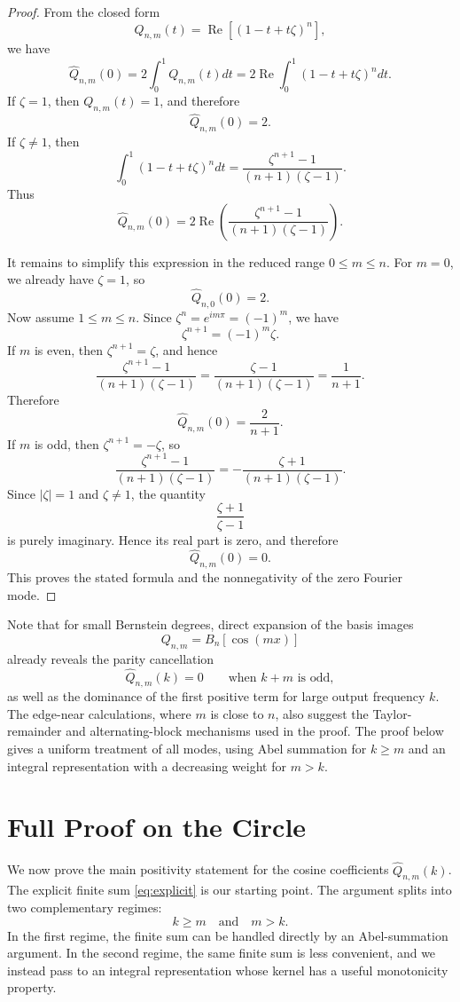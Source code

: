 \documentclass[10pt,a4paper]{amsart}
\DeclareMathOperator{\RealPart}{Re}
\renewcommand{\Re}{\RealPart}
\begin{document}
\begin{proof}
From the closed form
\[
Q_{n,m}(t)= \Re[( 1-t+t\zeta )^n],
\]
we have
\[
\widehat Q_{n,m}(0)
=
2\int_0^1 Q_{n,m}(t) dt
=
2\Re\int_0^1 (1-t+t\zeta)^n dt.
\]
If $\zeta = 1$, then $Q_{n,m}(t) = 1$, and therefore
\[
\widehat Q_{n,m}(0)=2.
\]
If $\zeta \ne 1$, then
\[
\int_0^1 (1-t+t\zeta)^n dt
=
\frac{\zeta^{n+1}-1}{(n+1)(\zeta - 1)}.
\]
Thus
\[
\widehat Q_{n,m}(0)
=
2\Re\!\left(
\frac{\zeta^{n+1}-1}{(n+1)(\zeta -1)}
\right).
\]

It remains to simplify this expression in the reduced range $0\le m\le n$.
For $m=0$, we already have $\zeta=  1$, so
\[
\widehat Q_{n,0}(0) = 2.
\]
Now assume $1\le m\le n$. Since $\zeta^n = e^{ im\pi } = (-1)^m$, we have
\[
\zeta^{n+1} = (-1)^m\zeta.
\]
If $m$ is even, then $\zeta^{n+1} = \zeta$, and hence
\[
\frac{\zeta^{n+1}-1}{(n+1)(\zeta-1)}
=
\frac{\zeta-1}{(n+1)(\zeta-1)}
=
\frac{1}{n+1}.
\]
Therefore
\[
\widehat Q_{n,m}(0) = \frac{2}{n+1}.
\]
If $m$ is odd, then $\zeta^{n+1} = -\zeta$, so
\[
\frac{\zeta^{n+1}-1}{(n+1)(\zeta-1)}
=
-\frac{\zeta+1}{(n+1)(\zeta-1)}.
\]
Since $|\zeta|=1$ and $\zeta\ne1$, the quantity
\[
\frac{\zeta+1}{\zeta-1}
\]
is purely imaginary. Hence its real part is zero, and therefore
\[
\widehat Q_{n,m}(0) =0.
\]
This proves the stated formula and the nonnegativity of the zero Fourier mode.
\end{proof}

Note that for small Bernstein degrees, direct expansion of the basis images 
\[
Q_{n,m}=B_n[\cos(mx)] 
\] 
already reveals the parity cancellation 
\[ 
\widehat Q_{n,m}(k)=0 \qquad\text{when }k+m\text{ is odd}, 
\] 
as well as the dominance of the first positive term for large output frequency $k$. The edge-near calculations, where $m$ is close to $n$, also suggest the Taylor-remainder and alternating-block mechanisms used in the proof. The proof below gives a uniform treatment of all modes, using Abel summation for $k\ge m$ and an integral representation with a decreasing weight for $m>k$.


\section{Full Proof on the Circle}
\label{sec:full-proof-circle}

We now prove the main positivity statement for the cosine coefficients $\widehat Q_{n,m}(k)$. The explicit finite sum \eqref{eq:explicit} is our starting point. The argument splits into two complementary regimes:
\[
k \ge m
\quad \text{and} \quad
m > k.
\]
In the first regime, the finite sum can be handled directly by an Abel-summation argument. In the second regime, the same finite sum is less convenient, and we instead pass to an integral representation whose kernel has a useful monotonicity property.
\end{document}
